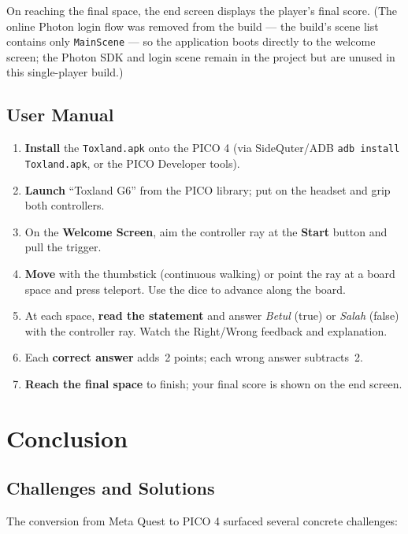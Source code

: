 \documentclass[a4paper,12pt]{article}
\begin{document}
On reaching the final space, the end screen displays the player's final score. (The online Photon login flow was removed from the build --- the build's scene list contains only \texttt{MainScene} --- so the application boots directly to the welcome screen; the Photon SDK and login scene remain in the project but are unused in this single-player build.)

\subsection{User Manual}

\begin{enumerate}
  \item \textbf{Install} the \texttt{Toxland.apk} onto the PICO 4 (via SideQuter/ADB \texttt{adb install Toxland.apk}, or the PICO Developer tools).
  \item \textbf{Launch} ``Toxland G6'' from the PICO library; put on the headset and grip both controllers.
  \item On the \textbf{Welcome Screen}, aim the controller ray at the \textbf{Start} button and pull the trigger.
  \item \textbf{Move} with the thumbstick (continuous walking) or point the ray at a board space and press teleport. Use the dice to advance along the board.
  \item At each space, \textbf{read the statement} and answer \emph{Betul} (true) or \emph{Salah} (false) with the controller ray. Watch the Right/Wrong feedback and explanation.
  \item Each \textbf{correct answer} adds~2 points; each wrong answer subtracts~2.
  \item \textbf{Reach the final space} to finish; your final score is shown on the end screen.
\end{enumerate}

\section{Conclusion}

\subsection{Challenges and Solutions}

The conversion from Meta Quest to PICO 4 surfaced several concrete challenges:
\end{document}
